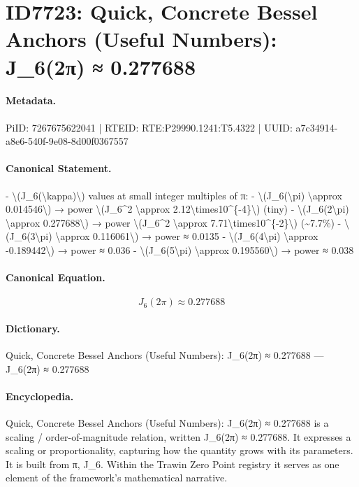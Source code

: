 \section*{ID7723: Quick, Concrete Bessel Anchors (Useful Numbers): J\_6(2π) ≈ 0.277688}
\paragraph{Metadata.}
PiID: 7267675622041 | RTEID: RTE:P29990.1241:T5.4322 | UUID: a7c34914-a8e6-540f-9e08-8d00f0367557

\paragraph{Canonical Statement.}
- \textbackslash{}(J\_6(\textbackslash{}kappa)\textbackslash{}) values at small integer multiples of π: - \textbackslash{}(J\_6(\textbackslash{}pi) \textbackslash{}approx 0.014546\textbackslash{}) → power \textbackslash{}(J\_6\textasciicircum{}2 \textbackslash{}approx 2.12\textbackslash{}times10\textasciicircum{}\{-4\}\textbackslash{}) (tiny) - \textbackslash{}(J\_6(2\textbackslash{}pi) \textbackslash{}approx 0.277688\textbackslash{}) → power \textbackslash{}(J\_6\textasciicircum{}2 \textbackslash{}approx 7.71\textbackslash{}times10\textasciicircum{}\{-2\}\textbackslash{}) (\textasciitilde{}7.7\%) - \textbackslash{}(J\_6(3\textbackslash{}pi) \textbackslash{}approx 0.116061\textbackslash{}) → power ≈ 0.0135 - \textbackslash{}(J\_6(4\textbackslash{}pi) \textbackslash{}approx -0.189442\textbackslash{}) → power ≈ 0.036 - \textbackslash{}(J\_6(5\textbackslash{}pi) \textbackslash{}approx 0.195560\textbackslash{}) → power ≈ 0.038

\paragraph{Canonical Equation.}
\[
J_6(2\pi) \approx 0.277688
\]

\paragraph{Dictionary.}
Quick, Concrete Bessel Anchors (Useful Numbers): J\_6(2π) ≈ 0.277688 — J\_6(2π) ≈ 0.277688

\paragraph{Encyclopedia.}
Quick, Concrete Bessel Anchors (Useful Numbers): J\_6(2π) ≈ 0.277688 is a scaling / order-of-magnitude relation, written J\_6(2π) ≈ 0.277688. It expresses a scaling or proportionality, capturing how the quantity grows with its parameters. It is built from π, J\_6. Within the Trawin Zero Point registry it serves as one element of the framework's mathematical narrative.
